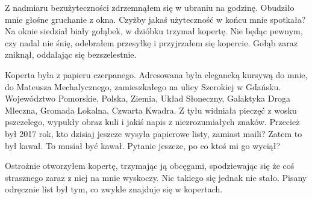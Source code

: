 Z nadmiaru bezużyteczności zdrzemnąłem się w ubraniu na godzinę. Obudziło mnie głośne gruchanie z okna.
Czyżby jakaś użyteczność w końcu mnie spotkała?
Na oknie siedział biały gołąbek, w dzióbku trzymał kopertę.
Nie będąc pewnym, czy nadal nie śnię, odebrałem przesyłkę i przyjrzałem się kopercie.
Gołąb zaraz zniknął, oddalając się bezszelestnie.

Koperta była z papieru czerpanego.
Adresowana była elegancką kursywą do mnie, do Mateusza Mechalycznego, zamieszkałego na ulicy Szerokiej w Gdańsku.
Województwo Pomorskie, Polska, Ziemia, Układ Słoneczny, Galaktyka Droga Mleczna, Gromada Lokalna, Czwarta Kwadra.
Z tyłu widniała pieczęć z wosku pszczelego, wypukły obraz kuli i jakiś napis z niezrozumiałych znaków.
Przecież był 2017 rok, kto dzisiaj jeszcze wysyła papierowe listy, zamiast maili?
Zatem to był kawał. To musiał być kawał. Pytanie jeszcze, po co ktoś mi go wyciął?

Ostrożnie otworzyłem kopertę, trzymając ją obcęgami, spodziewając się że coś strasznego zaraz z niej na mnie wyskoczy.
Nic takiego się jednak nie stało.
Pisany odręcznie list był tym, co zwykle znajduje się w kopertach.


